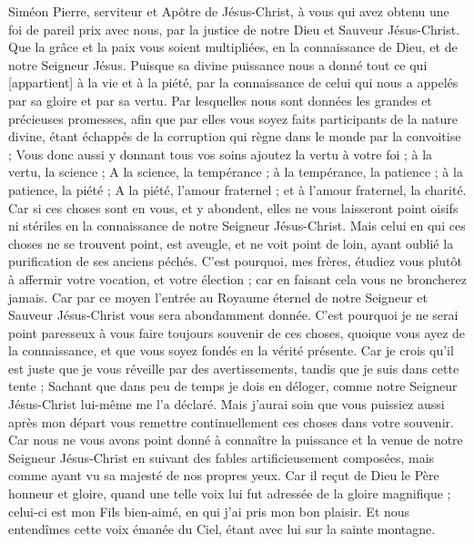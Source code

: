 \BFont
\begin{multicols}{2}
\VerseOne{}Siméon Pierre, serviteur et Apôtre de Jésus-Christ, à vous qui avez obtenu une foi de pareil prix avec nous, par la justice de notre Dieu et Sauveur Jésus-Christ.
Que la grâce et la paix vous soient multipliées, en la connaissance de Dieu, et de notre Seigneur Jésus.
Puisque sa divine puissance nous a donné tout ce qui [appartient] à la vie et à la piété, par la connaissance de celui qui nous a appelés par sa gloire et par sa vertu.
Par lesquelles nous sont données les grandes et précieuses promesses, afin que par elles vous soyez faits participants de la nature divine, étant échappés de la corruption qui règne dans le monde par la convoitise ;
Vous donc aussi y donnant tous vos soins ajoutez la vertu à votre foi ; à la vertu, la science ;
A la science, la tempérance ; à la tempérance, la patience ; à la patience, la piété ;
A la piété, l'amour fraternel ; et à l'amour fraternel, la charité.
Car si ces choses sont en vous, et y abondent, elles ne vous laisseront point oisifs ni stériles en la connaissance de notre Seigneur Jésus-Christ.
Mais celui en qui ces choses ne se trouvent point, est aveugle, et ne voit point de loin, ayant oublié la purification de ses anciens péchés.
C'est pourquoi, mes frères, étudiez vous plutôt à affermir votre vocation, et votre élection ; car en faisant cela vous ne broncherez jamais.
Car par ce moyen l'entrée au Royaume éternel de notre Seigneur et Sauveur Jésus-Christ vous sera abondamment donnée.
C'est pourquoi je ne serai point paresseux à vous faire toujours souvenir de ces choses, quoique vous ayez de la connaissance, et que vous soyez fondés en la vérité présente.
Car je crois qu'il est juste que je vous réveille par des avertissements, tandis que je suis dans cette tente ;
Sachant que dans peu de temps je dois en déloger, comme notre Seigneur Jésus-Christ lui-même me l'a déclaré.
Mais j'aurai soin que vous puissiez aussi après mon départ vous remettre continuellement ces choses dans votre souvenir.
Car nous ne vous avons point donné à connaître la puissance et la venue de notre Seigneur Jésus-Christ en suivant des fables artificieusement composées, mais comme ayant vu sa majesté de nos propres yeux.
Car il reçut de Dieu le Père honneur et gloire, quand une telle voix lui fut adressée de la gloire magnifique ; celui-ci est mon Fils bien-aimé, en qui j'ai pris mon bon plaisir.
Et nous entendîmes cette voix émanée du Ciel, étant avec lui sur la sainte montagne.

\end{multicols}
